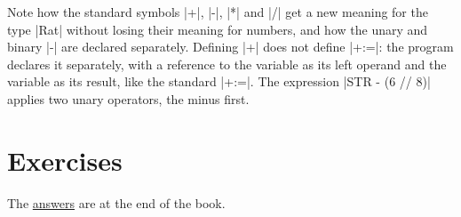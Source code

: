 
Note how the standard symbols \code|+|, \code|-|, \code|*| and \code|/|
get a new meaning for the type \code|Rat| without losing their meaning
for numbers, and how the unary and binary \code|-| are declared
separately. Defining \code|+| does not define \code|+:=|: the program
declares it separately, with a reference to the variable as its left
operand and the variable as its result, like the standard \code|+:=|. The expression \code|STR - (6 // 8)| applies two unary
operators, the minus first.

\section*{Exercises}

The \hyperref[ans-ch5]{answers} are at the end of the book.

